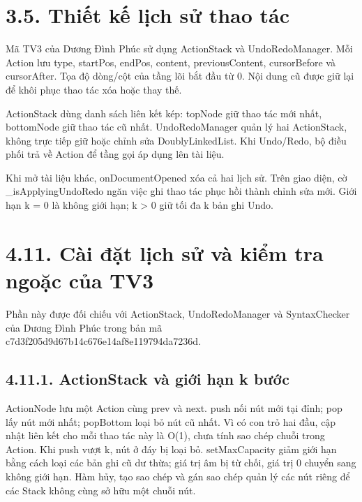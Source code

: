 
\section{3.5. Thiết kế lịch sử thao
tác}\label{tv4-22-3-5-thiux1ebft-kux1ebf-lux1ecbch-sux1eed-thao-tuxe1c}

Mã TV3 của Dương Đình Phúc sử dụng ActionStack và UndoRedoManager. Mỗi
Action lưu type, startPos, endPos, content, previousContent,
cursorBefore và cursorAfter. Tọa độ dòng/cột của tầng lõi bắt đầu từ 0.
Nội dung cũ được giữ lại để khôi phục thao tác xóa hoặc thay thế.

ActionStack dùng danh sách liên kết kép: topNode giữ thao tác mới nhất,
bottomNode giữ thao tác cũ nhất. UndoRedoManager quản lý hai
ActionStack, không trực tiếp giữ hoặc chỉnh sửa DoublyLinkedList. Khi
Undo/Redo, bộ điều phối trả về Action để tầng gọi áp dụng lên tài liệu.

Khi mở tài liệu khác, onDocumentOpened xóa cả hai lịch sử. Trên giao
diện, cờ \_isApplyingUndoRedo ngăn việc ghi thao tác phục hồi thành
chỉnh sửa mới. Giới hạn k = 0 là không giới hạn; k \textgreater{} 0 giữ
tối đa k bản ghi Undo.


\section{4.11. Cài đặt lịch sử và kiểm tra ngoặc của
TV3}\label{tv4-22-4-11-cuxe0i-ux111ux1eb7t-lux1ecbch-sux1eed-vuxe0-kiux1ec3m-tra-ngoux1eb7c-cux1ee7a-tv3}

Phần này được đối chiếu với ActionStack, UndoRedoManager và
SyntaxChecker của Dương Đình Phúc trong bản mã
c7d3f205d9d67b14c676e14af8e119794da7236d.

\subsection{4.11.1. ActionStack và giới hạn k
bước}\label{tv4-22-4-11-actionstack-vuxe0-giux1edbi-hux1ea1n-k-bux1b0ux1edbc}

ActionNode lưu một Action cùng prev và next. push nối nút mới tại đỉnh;
pop lấy nút mới nhất; popBottom loại bỏ nút cũ nhất. Vì có con trỏ hai
đầu, cập nhật liên kết cho mỗi thao tác này là O(1), chưa tính sao chép
chuỗi trong Action. Khi push vượt k, nút ở đáy bị loại bỏ.
setMaxCapacity giảm giới hạn bằng cách loại các bản ghi cũ dư thừa; giá
trị âm bị từ chối, giá trị 0 chuyển sang không giới hạn. Hàm hủy, tạo
sao chép và gán sao chép quản lý các nút riêng để các Stack không cùng
sở hữu một chuỗi nút.

